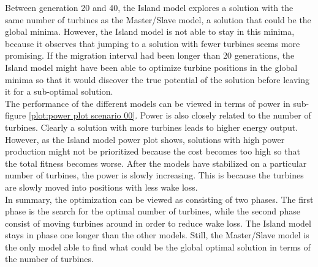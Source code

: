 Between generation 20 and 40, the Island model explores a solution with the same number of turbines as the Master/Slave model, a solution that could be the global minima. However, the Island model is not able to stay in this minima, because it observes that jumping to a solution with fewer turbines seems more promising. If the migration interval had been longer than 20 generations, the Island model might have been able to optimize turbine positions in the global minima so that it would discover the true potential of the solution before leaving it for a sub-optimal solution.\\


\noindent The performance of the different models can be viewed in terms of power in sub-figure \ref{plot:power plot scenario 00}. Power is also closely related to the number of turbines. Clearly a solution with more turbines leads to higher energy output. However, as the Island model power plot shows, solutions with high power production might not be prioritized because the cost becomes too high so that the total fitness becomes worse. After the models have stabilized on a particular number of turbines, the power is slowly increasing. This is because the turbines are slowly moved into positions with less wake loss. \\


\noindent In summary, the optimization can be viewed as consisting of two phases. The first phase is the search for the optimal number of turbines, while the second phase consist of moving turbines around in order to reduce wake loss. The Island model stays in phase one longer than the other models. Still, the Master/Slave model is the only model able to find what could be the global optimal solution in terms of the number of turbines. \\

